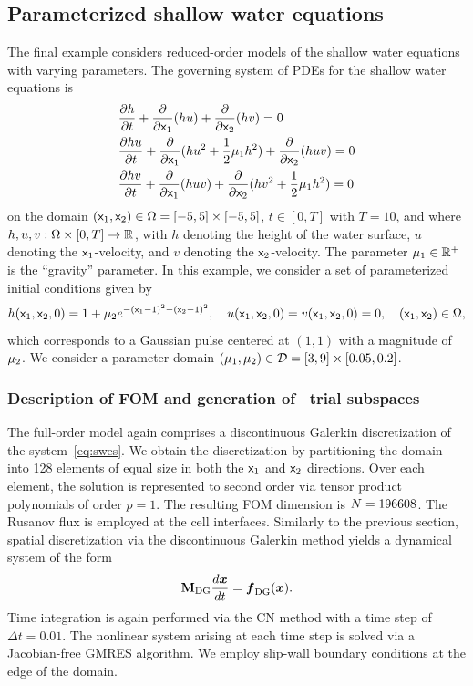 \subsection{Parameterized shallow water equations}\label{sec:swe}
The final example considers reduced-order models of the shallow water equations with varying parameters. The governing system of PDEs for the shallow water equations is 
\begin{equation}\label{eq:swes}
\begin{split}
&\frac{\partial h}{\partial t} + \frac{\partial}{\partial \mathsf{x}_1 }(  h u) + \frac{\partial}{\partial \mathsf{x}_2 }( h v) = 0\\
&\frac{\partial h u}{\partial t} + \frac{\partial}{\partial \mathsf{x}_1 } (h u^2 + \frac{1}{2} \mu_1 h^2) + \frac{\partial}{\partial \mathsf{x}_2 }( h u v) = 0\\
&\frac{\partial h v}{\partial t} + \frac{\partial}{\partial \mathsf{x}_1 } (h u v) + \frac{\partial}{\partial \mathsf{x}_2 }( h v^2 +  \frac{1}{2} \mu_1 h^2) = 0
\end{split}
\end{equation}
on the domain $(\mathsf{x}_1 ,\mathsf{x}_2 ) \in \Omega = [-5,5] \times [-5,5]$, $t \in [0,T]$
with $T=10$, and 
where $h,u,v: \Omega \times [0,T] \rightarrow \mathbb{R}^{}$, with $h$ denoting the height
of the water surface, $u$ denoting the $\mathsf{x}_1$-velocity, and $v$
denoting the $\mathsf{x}_2$-velocity.
The parameter $\mu_1 \in \mathbb{R}^{+}$ is the ``gravity'' parameter.  In this example, we consider a set of parameterized initial conditions given by 
$$h(\mathsf{x}_1
,\mathsf{x}_2 ,0) = 1 + \mu_2 e^{ -(\mathsf{x}_1  - 1)^2 -
(\mathsf{x}_2  - 1)^2 }, \quad u(\mathsf{x}_1 ,\mathsf{x}_2 ,0) =
v(\mathsf{x}_1 ,\mathsf{x}_2 ,0) = 0,\quad (\mathsf{x}_1 ,\mathsf{x}_2 ) \in
\Omega,$$ which corresponds to a Gaussian pulse centered at $(1,1)$ with
a magnitude of $\mu_2$. We consider a parameter domain
$(\mu_1,\mu_2)\in\mathcal{D} = [3,9]\times [0.05,0.2]$.

\subsubsection{Description of FOM and generation of \spatialAcronym\ trial subspaces}
The full-order model again comprises a discontinuous Galerkin discretization of the system~\eqref{eq:swes}. We obtain the discretization 
by partitioning the domain into 128 elements of equal size in both the $\mathsf{x}_1$ and $\mathsf{x}_2$ directions. Over each element, 
the solution is represented to second order via tensor product polynomials of order $p=1$. The resulting FOM dimension is $N = 196608$. The Rusanov flux is employed at the cell interfaces. Similarly to the previous section, spatial discretization via the discontinuous Galerkin method yields a dynamical system 
of the form
$$  \mathbf{M}_{\text{DG}}\frac{d \boldsymbol x}{dt} = \boldsymbol f_{\text{DG}} (\boldsymbol x).$$
Time integration 
is again performed via the CN method with a time step of $\Delta t = 0.01$. The nonlinear system arising at each time step is solved via a Jacobian-free 
GMRES algorithm. We employ slip-wall boundary conditions at the edge of the domain. 


